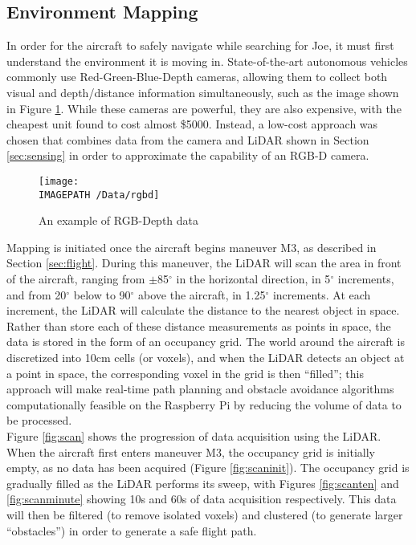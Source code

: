 \subsection{Environment Mapping}
In order for the aircraft to safely navigate while searching for Joe, it must first understand the environment it is moving in. State-of-the-art autonomous vehicles commonly use Red-Green-Blue-Depth cameras\cite{ref:rgbd}, allowing them to collect both visual and depth/distance information simultaneously, such as the image shown in Figure \ref{fig:rgbd}. While these cameras are powerful, they are also expensive, with the cheapest unit found to cost almost \$5000\cite{ref:rgbdcost}. Instead, a low-cost approach was chosen that combines data from the camera and LiDAR shown in Section \ref{sec:sensing} in order to approximate the capability of an RGB-D camera.\\

\begin{figure}[!ht]
	\centering
	\texttt{[image: \\IMAGEPATH /Data/rgbd]}
	\caption{An example of RGB-Depth data}
	\label{fig:rgbd}
\end{figure}

Mapping is initiated once the aircraft begins maneuver M3, as described in Section \ref{sec:flight}. During this maneuver, the LiDAR will scan the area in front of the aircraft, ranging from $\pm$85$^\circ$ in the horizontal direction, in 5$^\circ$ increments, and from 20$^\circ$ below to 90$^\circ$ above the aircraft, in 1.25$^\circ$ increments. At each increment, the LiDAR will calculate the distance to the nearest object in space.\\

Rather than store each of these distance measurements as points in space, the data is stored in the form of an occupancy grid. The world around the aircraft is discretized into 10cm cells (or voxels), and when the LiDAR detects an object at a point in space, the corresponding voxel in the grid is then ``filled''; this approach will make real-time path planning and obstacle avoidance algorithms computationally feasible on the Raspberry Pi by reducing the volume of data to be processed.\\

Figure \ref{fig:scan} shows the progression of data acquisition using the LiDAR. When the aircraft first enters maneuver M3, the occupancy grid is initially empty, as no data has been acquired (Figure \ref{fig:scaninit}). The occupancy grid is gradually filled as the LiDAR performs its sweep, with Figures \ref{fig:scanten} and \ref{fig:scanminute} showing 10s and 60s of data acquisition respectively. This data will then be filtered (to remove isolated voxels) and clustered (to generate larger ``obstacles'') in order to generate a safe flight path.

